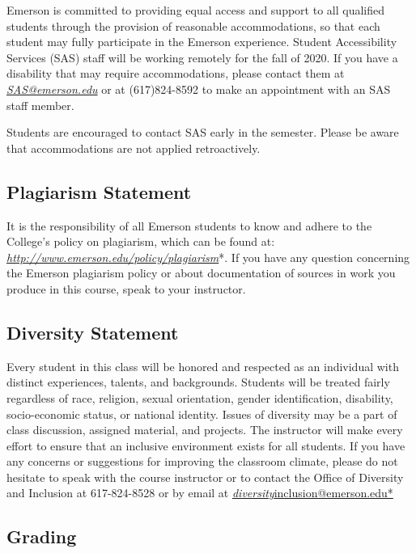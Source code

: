 \documentclass[
  letterpaper,
  DIV=11,
  numbers=noendperiod]{scrartcl}
\begin{document}
Emerson is committed to providing equal access and support to all
qualified students through the provision of reasonable accommodations,
so that each student may fully participate in the Emerson experience.
Student Accessibility Services (SAS) staff will be working remotely for
the fall of 2020. If you have a disability that may require
accommodations, please contact them at
\href{mailto:SAS@emerson.edu}{\emph{SAS@emerson.edu}} or at
(617)824-8592 to make an appointment with an SAS staff member.

Students are encouraged to contact SAS early in the semester. Please be
aware that accommodations are not applied retroactively.

\subsection{Plagiarism Statement}\label{plagiarism-statement}

It is the responsibility of all Emerson students to know and adhere to
the College's policy on plagiarism, which can be found at:
\href{http://www.emerson.edu/policy/plagiarism}{\emph{http://www.emerson.edu/policy/plagiarism}}*.
If you have any question concerning the Emerson plagiarism policy or
about documentation of sources in work you produce in this course, speak
to your instructor.

\subsection{Diversity Statement}\label{diversity-statement}

Every student in this class will be honored and respected as an
individual with distinct experiences, talents, and backgrounds. Students
will be treated fairly regardless of race, religion, sexual orientation,
gender identification, disability, socio-economic status, or national
identity. Issues of diversity may be a part of class discussion,
assigned material, and projects. The instructor will make every effort
to ensure that an inclusive environment exists for all students. If you
have any concerns or suggestions for improving the classroom climate,
please do not hesitate to speak with the course instructor or to contact
the Office of Diversity and Inclusion at 617-824-8528 or by email at
\href{mailto:diversity*inclusion@emerson.edu}{\emph{diversity}inclusion@emerson.edu*}

\subsection{Grading}\label{grading}
\end{document}
